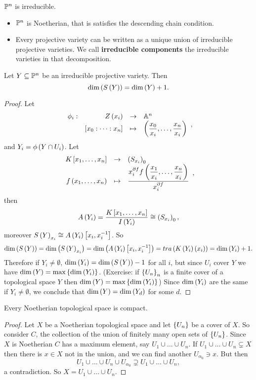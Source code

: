 \begin{example}
$ \P^n $ is irreducible.
\end{example}

\begin{proposition}
\hfill
\begin{itemize}
\item $ \P^n $ is Noetherian, that is satisfies the descending chain condition.
\item Every projective variety can be written as a unique union of irreducible projective varieties. We call \textbf{irreducible components} the irreducible varieties in that decomposition.
\end{itemize}
\end{proposition}

\begin{theorem}
Let $ Y \subseteq \P^n $ be an irreducible projective variety. Then
$$ \dim\rb{S\rb{Y}} = \dim\rb{Y} + 1. $$
\end{theorem}

\begin{proof}
Let
$$ \function[\phi_i]{Z\rb{x_i}}{\A^n}{\sb{x_0 : \dots : x_n}}{\rb{\dfrac{x_0}{x_i}, \dots, \dfrac{x_n}{x_i}}}, $$
and $ Y_i = \phi\rb{Y \cap U_i} $. Let
$$ \function{K\sb{x_1, \dots, x_n}}{\rb{S_{x_i}}_0}{f\rb{x_1, \dots, x_n}}{\dfrac{x_i^{\partial f}f\rb{\dfrac{x_1}{x_i}, \dots, \dfrac{x_n}{x_i}}}{x_i^{\partial f}}}, $$
then
$$ A\rb{Y_i} = \dfrac{K\sb{x_1, \dots, x_n}}{I\rb{Y_i}} \cong \rb{S_{x_i}}_0, $$
moreover $ S\rb{Y}_{x_i} \cong A\rb{Y_i}\sb{x_i, x_i^{-1}} $. So
$$ \dim\rb{S\rb{Y}} = \dim\rb{S\rb{Y}_{x_i}} = \dim\rb{A\rb{Y_i}\sb{x_i, x_i^{-1}}} = tra\rb{K\rb{Y_i}\rb{x_i}} = \dim\rb{Y_i} + 1. $$
Therefore if $ Y_i \ne \emptyset $, $ \dim\rb{Y_i} = \dim\rb{S\rb{Y}} - 1 $ for all $ i $, but since $ U_i $ cover $ Y $ we have $ \dim\rb{Y} = \max\cb{\dim\rb{Y_i}} $. (Exercise: if $ \cb{U_n}_n $ is a finite cover of a topological space $ Y $ then $ \dim\rb{Y} = \max\cb{\dim\rb{Y_i}} $) Since $ \dim\rb{Y_i} $ are the same if $ Y_i \ne \emptyset $, we conclude that $ \dim\rb{Y} = \dim\rb{Y_d} $ for some $ d $.
\end{proof}


\begin{proposition}
Every Noetherian topological space is compact.
\end{proposition}

\begin{proof}
Let $ X $ be a Noetherian topological space and let $ \cb{U_n} $ be a cover of $ X $. So consider $ C $, the collection of the union of finitely many open sets of $ \cb{U_n} $. Since $ X $ is Noetherian $ C $ has a maximum element, say $ U_1 \cup \dots \cup U_n $. If $ U_1 \cup \dots \cup U_n \subsetneq X $ then there is $ x \in X $ not in the union, and we can find another $ U_{\alpha_0} \ni x $. But then
$$ U_1 \cup \dots \cup U_n \cup U_{\alpha_0} \supsetneq U_1 \cup \dots \cup U_n, $$
a contradiction. So $ X = U_1 \cup \dots \cup U_n $.
\end{proof}

